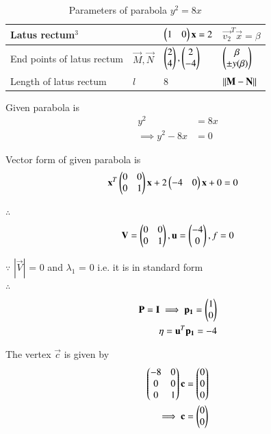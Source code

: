 \documentclass[journal,12pt,twocolumn]{IEEEtran}
\begin{document}
\begin{table}[!ht]
\begin{center}
\begin{tabular}{ | m{1.4cm} | m{1.0cm}| m{2.4cm} | m{2.3cm} | }
\hline
Latus \newline rectum$^{3}$ & & $\begin{pmatrix}1 & 0\end{pmatrix}\mathbf{x}=2$ & $\vec{v_2}^T\vec{x}=\beta$\\
\hline
End \newline points \newline of latus \newline rectum & $\vec{M},\vec{N}$ & $\begin{pmatrix}2\\4\end{pmatrix},\begin{pmatrix}2\\-4\end{pmatrix}$ & $\begin{pmatrix}\beta \\ \pm y(\beta)\end{pmatrix}$ \\
\hline
Length \newline of latus \newline rectum & $l$ & 8 & $\left\lVert\mathbf{M}-\mathbf{N}\right\rVert$\\
\hline
\end{tabular}
\end{center}
\caption{Parameters of parabola $y^2=8x$}
\label{tab:table1}
\end{table}

\clearpage
Given parabola is 
\begin{align}
y^2 &= 8x
\\
\implies y^2 - 8x &= 0
\end{align}

Vector form of given parabola is
\begin{align}
\mathbf{x}^T\begin{pmatrix}0 & 0 \\ 0 & 1\end{pmatrix}\mathbf{x} + 2\begin{pmatrix}-4 & 0\end{pmatrix}\mathbf{x} + 0 &= 0 
\end{align}

$\therefore$
\begin{align}
 \mathbf{V} = \begin{pmatrix}0 & 0 \\ 0 & 1\end{pmatrix} ,
 \mathbf{u} = \begin{pmatrix}-4\\0\end{pmatrix} ,
 f = 0
\end{align}

$\because$
$|\vec{V}|$ = 0 and $\lambda_1$ = 0 i.e. it is in standard form
\\
$\therefore$
\begin{align}
\mathbf{P}=\mathbf{I} \implies \mathbf{p_1} = \begin{pmatrix}1\\0\end{pmatrix}
\\
\eta = \mathbf{u}^T\mathbf{p_1} = -4
\end{align}

The vertex $\vec{c}$ is given by
\begin{align}
\begin{pmatrix}-8 & 0\\0 & 0\\0 & 1\end{pmatrix}\mathbf{c} &= \begin{pmatrix}0\\0\\0\end{pmatrix}
\\
\implies \mathbf{c} &= \begin{pmatrix}0\\0\end{pmatrix}
\end{align}
\end{document}

